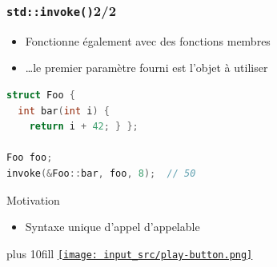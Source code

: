 \documentclass[C++.tex]{subfiles}
\begin{document}
\begin{frame}[fragile]
	\frametitle{\lstinline|std::invoke()|\titlehfill{}2/2}
	\begin{itemize}
		\item Fonctionne également avec des fonctions membres
		\item \ldots{}le premier paramètre fourni est l'objet à utiliser
	\end{itemize}

	\begin{lstlisting}[language=C++]
struct Foo {
  int bar(int i) {
    return i + 42; } };

Foo foo;
invoke(&Foo::bar, foo, 8);  // 50\end{lstlisting}

	\begin{block}{Motivation}
		\begin{itemize}
			\item Syntaxe unique d'appel d'appelable
		\end{itemize}
	\end{block}

	\vskip 10mm plus 10fill
	\hfill
	\href{https://godbolt.org/#g:!((g:!((g:!((h:codeEditor,i:(filename:'1',fontScale:14,fontUsePx:'0',j:1,lang:c%2B%2B,selection:(endColumn:1,endLineNumber:28,positionColumn:1,positionLineNumber:28,selectionStartColumn:1,selectionStartLineNumber:28,startColumn:1,startLineNumber:28),source:'%23include+%3Ciostream%3E%0A%23include+%3Cfunctional%3E%0A%0Astatic+int+foo(int+i)%0A%7B%0A++return+i+%2B+42%3B%0A%7D%0A%0Astruct+Foo%0A%7B%0A++int+bar(int+i)%0A++%7B%0A++++return+i+%2B+42%3B%0A++%7D%0A%7D%3B%0A%0Aint+main()%0A%7B%0A++%7B%0A++++std::cout+%3C%3C+std::invoke(%26foo,+8)+%3C%3C+!'%5Cn!'%3B%0A++%7D%0A%0A++%7B%0A++++Foo+foo%3B%0A++++std::cout+%3C%3C+std::invoke(%26Foo::bar,+foo,+8)+%3C%3C+!'%5Cn!'%3B%0A++%7D%0A%7D%0A'),l:'5',n:'0',o:'C%2B%2B+source+%231',t:'0')),k:50,l:'4',n:'0',o:'',s:0,t:'0'),(g:!((h:executor,i:(argsPanelShown:'1',compilationPanelShown:'0',compiler:g112,compilerOutShown:'0',execArgs:'',execStdin:'',fontScale:14,fontUsePx:'0',j:1,lang:c%2B%2B,libs:!((name:boost,ver:'175')),options:'-std%3Dc%2B%2B17',source:1,stdinPanelShown:'1',tree:'1',wrap:'0'),l:'5',n:'0',o:'Executor+x86-64+gcc+11.2+(C%2B%2B,+Editor+%231)',t:'0')),header:(),k:50,l:'4',n:'0',o:'',s:0,t:'0')),l:'2',n:'0',o:'',t:'0')),version:4}{\texttt{[image: input\_src/play-button.png]}}
\end{frame}
\end{document}
